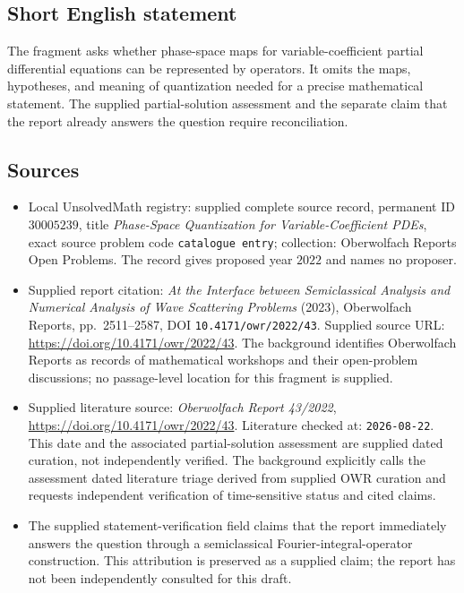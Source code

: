 \documentclass[11pt]{article}
\begin{document}
\subsection{Short English statement}
The fragment asks whether phase-space maps for variable-coefficient partial differential equations can be represented by operators. It omits the maps, hypotheses, and meaning of quantization needed for a precise mathematical statement. The supplied partial-solution assessment and the separate claim that the report already answers the question require reconciliation.
\subsection{Sources}
\begin{itemize}
\item Local UnsolvedMath registry: supplied complete source record, permanent ID \(30005239\), title \emph{Phase-Space Quantization for Variable-Coefficient PDEs}, exact source problem code \texttt{catalogue entry}; collection: Oberwolfach Reports Open Problems. The record gives proposed year \(2022\) and names no proposer.
\item Supplied report citation: \emph{At the Interface between Semiclassical Analysis and Numerical Analysis of Wave Scattering Problems} (2023), Oberwolfach Reports, pp.~2511--2587, DOI \texttt{10.4171/owr/2022/43}. Supplied source URL: \url{https://doi.org/10.4171/owr/2022/43}. The background identifies Oberwolfach Reports as records of mathematical workshops and their open-problem discussions; no passage-level location for this fragment is supplied.
\item Supplied literature source: \emph{Oberwolfach Report 43/2022}, \url{https://doi.org/10.4171/owr/2022/43}. Literature checked at: \texttt{2026-08-22}. This date and the associated partial-solution assessment are supplied dated curation, not independently verified. The background explicitly calls the assessment dated literature triage derived from supplied OWR curation and requests independent verification of time-sensitive status and cited claims.
\item The supplied statement-verification field claims that the report immediately answers the question through a semiclassical Fourier-integral-operator construction. This attribution is preserved as a supplied claim; the report has not been independently consulted for this draft.
\end{itemize}
\end{document}

